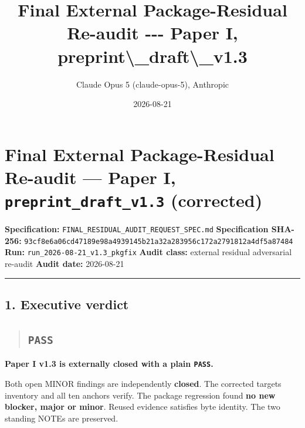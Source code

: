 \documentclass[
  9pt,
  a4paper,
]{article}
\title{Final External Package-Residual Re-audit -\/-\/- Paper I,
preprint\textbackslash\_draft\textbackslash\_v1.3}
\author{Claude Opus 5 (claude-opus-5), Anthropic}
\date{2026-08-21}
\begin{document}
\maketitle

\section{\texorpdfstring{Final External Package-Residual Re-audit ---
Paper I, \texttt{preprint\_draft\_v1.3}
(corrected)}{Final External Package-Residual Re-audit --- Paper I, preprint\_draft\_v1.3 (corrected)}}\label{final-external-package-residual-re-audit--paper-i-preprint_draft_v13-corrected}

\textbf{Specification:}
\texttt{FINAL\_RESIDUAL\_AUDIT\_REQUEST\_SPEC.md} \textbf{Specification
SHA-256:}
\texttt{93cf8e6a06cd47189e98a4939145b21a32a283956c172a2791812a4df5a87484}
\textbf{Run:} \texttt{run\_2026-08-21\_v1.3\_pkgfix} \textbf{Audit
class:} external residual adversarial re-audit \textbf{Audit date:}
2026-08-21

\begin{center}\rule{0.5\linewidth}{0.5pt}\end{center}

\subsection{1. Executive verdict}\label{1-executive-verdict}

\begin{quote}
\mbox{}%
\subsection{\texorpdfstring{\texttt{PASS}}{PASS}}\label{pass}
\end{quote}

\textbf{Paper I v1.3 is externally closed with a plain \texttt{PASS}.}

Both open MINOR findings are independently \textbf{closed}. The
corrected target\textquotesingle s inventory and all ten anchors verify.
The package regression found \textbf{no new blocker, major or minor}.
Reused evidence satisfies byte identity. The two standing NOTEs are
preserved.
\end{document}
